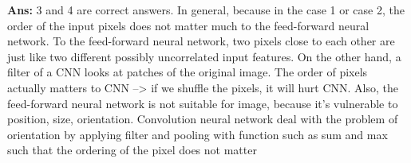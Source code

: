\documentclass{article}
\newcounter{problem}[section]
\newenvironment{proof}{\begin{mdframed}\textbf{Ans:}}{ \end{mdframed}}
\begin{document}
\begin{proof}
    3 and 4 are correct answers. In general, because in the case 1 or case 2, the order of the input pixels does not matter much to the feed-forward neural network. To the feed-forward neural network, two pixels close to each other are just like two different possibly uncorrelated input features. On the other hand, a filter of a CNN looks at patches of the original image. The order of pixels actually matters to CNN --> if we shuffle the pixels, it will hurt CNN. 
    Also, the feed-forward neural network is not suitable for image, because it's vulnerable to position, size, orientation. Convolution neural network deal with the problem of orientation by applying filter and pooling with function such as sum and max such that the ordering of the pixel does not matter
\end{proof}
\end{document}
